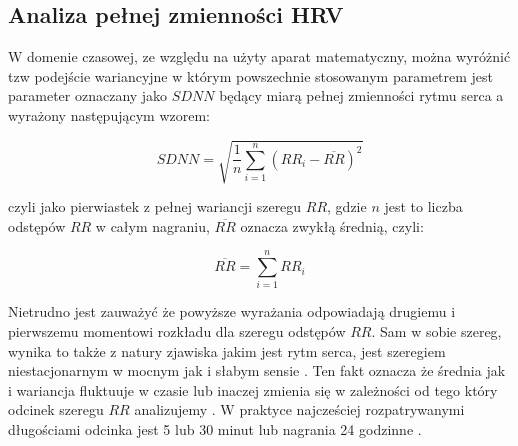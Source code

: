 \subsection{Analiza pełnej zmienności HRV}
\label{subsec:pelna_zmiennosc}

W domenie czasowej, ze względu na użyty aparat matematyczny, można wyróżnić tzw podejście
wariancyjne w którym powszechnie stosowanym parametrem jest parameter oznaczany jako
$SDNN$ będący miarą pełnej zmienności rytmu serca a wyrażony następującym wzorem:  

\begin{equation}\label{eq6}
SDNN = \sqrt{\frac{1}{n}\sum_{i=1}^{n}(RR_{i} - \overline{RR})^{2}}
\end{equation}

czyli jako pierwiastek z pełnej wariancji szeregu $RR$, gdzie $n$ jest to liczba odstępów $RR$
w całym nagraniu, $\overline{RR}$ oznacza zwykłą średnią, czyli:

\begin{equation}
\overline{RR} = \sum_{i=1}^{n}RR_{i}
\end{equation}

Nietrudno jest zauważyć że powyższe wyrażania odpowiadają drugiemu i pierwszemu momentowi
rozkładu dla szeregu odstępów $RR$. Sam w sobie szereg, wynika to także z natury
zjawiska jakim jest rytm serca, jest szeregiem niestacjonarnym w mocnym jak i słabym
sensie \cite{shumway}. Ten fakt oznacza że średnia jak i wariancja fluktuuje w czasie lub inaczej zmienia
się w zależności od tego który odcinek szeregu $RR$ analizujemy \cite{hrv_origins, task2}. W praktyce najcześciej
rozpatrywanymi długościami odcinka jest 5 lub 30 minut lub nagrania 24 godzinne \cite{hrv_origins, task2}.
